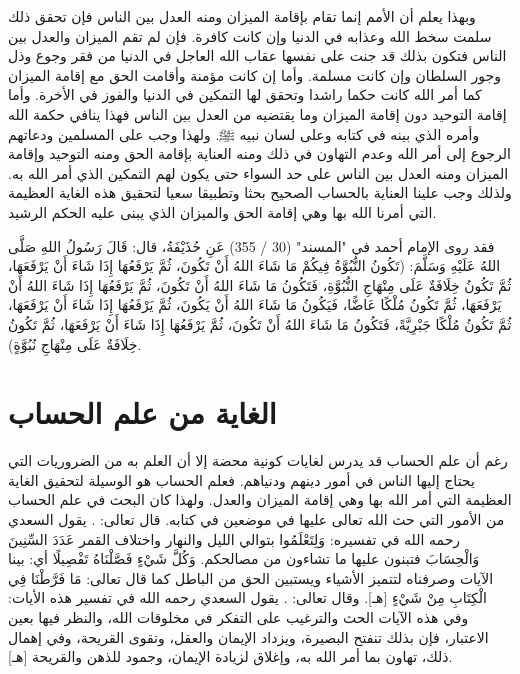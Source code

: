 وبهذا يعلم أن الأمم إنما تقام بإقامة الميزان ومنه العدل بين الناس فإن تحقق ذلك سلمت سخط الله وعذابه في الدنيا وإن كانت كافرة. فإن لم تقم الميزان والعدل بين الناس فتكون بذلك قد جنت على نفسها عقاب الله العاجل في الدنيا من فقر وجوع وذل وجور السلطان  وإن كانت مسلمة. وأما إن كانت مؤمنة وأقامت الحق مع إقامة الميزان كما أمر الله كانت حكما راشدا وتحقق لها التمكين في الدنيا والفوز في الأخرة. وأما إقامة التوحيد دون إقامة الميزان وما يقتضيه من العدل بين الناس فهذا ينافي حكمة الله وأمره الذي بينه في كتابه وعلى لسان نبيه ﷺ. ولهذا وجب على المسلمين ودعاتهم الرجوع إلى أمر الله وعدم التهاون في ذلك ومنه العناية بإقامة الحق ومنه التوحيد وإقامة الميزان ومنه العدل بين الناس على حد السواء حتى يكون لهم التمكين الذي أمر الله به. ولذلك وجب علينا العناية بالحساب الصحيح بحثا وتطبيقا سعيا لتحقيق هذه الغاية العظيمة التي أمرنا الله بها وهي إقامة الحق والميزان الذي يبنى عليه الحكم الرشيد.

فقد روى الإمام أحمد في "المسند" (30 / 355) عَنِ حُذَيْفَةُ، قال: قَالَ رَسُولُ اللهِ صَلَّى اللهُ عَلَيْهِ وَسَلَّمَ: (تَكُونُ النُّبُوَّةُ فِيكُمْ مَا شَاءَ اللهُ أَنْ تَكُونَ، ثُمَّ يَرْفَعُهَا إِذَا شَاءَ أَنْ يَرْفَعَهَا، ثُمَّ تَكُونُ خِلَافَةٌ عَلَى مِنْهَاجِ النُّبُوَّةِ، فَتَكُونُ مَا شَاءَ اللهُ أَنْ تَكُونَ، ثُمَّ يَرْفَعُهَا إِذَا شَاءَ اللهُ أَنْ يَرْفَعَهَا، ثُمَّ تَكُونُ مُلْكًا عَاضًّا، فَيَكُونُ مَا شَاءَ اللهُ أَنْ يَكُونَ، ثُمَّ يَرْفَعُهَا إِذَا شَاءَ أَنْ يَرْفَعَهَا، ثُمَّ تَكُونُ مُلْكًا جَبْرِيَّةً، فَتَكُونُ مَا شَاءَ اللهُ أَنْ تَكُونَ، ثُمَّ يَرْفَعُهَا إِذَا شَاءَ أَنْ يَرْفَعَهَا، ثُمَّ تَكُونُ خِلَافَةٌ عَلَى مِنْهَاجِ نُبُوَّةٍ).


\section{الغاية من علم الحساب}

رغم أن علم الحساب قد يدرس لغايات كونية محضة إلا أن العلم به من الضروريات التي يحتاج إليها الناس في أمور دينهم ودنياهم. فعلم الحساب هو الوسيلة لتحقيق الغاية العظيمة التي أمر الله بها وهي إقامة الميزان والعدل. ولهذا كان البحث في علم الحساب من الأمور التي حث الله تعالى عليها في موضعين في كتابه. قال تعالى: \quranayah*[17][12]{\footnotesize \surahname*[17]}.
يقول السعدي رحمه الله في تفسيره:
{ وَلِتَعْلَمُوا } بتوالي الليل والنهار واختلاف القمر { عَدَدَ السِّنِينَ وَالْحِسَابَ } فتبنون عليها ما تشاءون من مصالحكم. { وَكُلَّ شَيْءٍ فَصَّلْنَاهُ تَفْصِيلًا } أي: بينا الآيات وصرفناه لتتميز الأشياء ويستبين الحق من الباطل كما قال تعالى: { مَا فَرَّطْنَا فِي الْكِتَابِ مِنْ شَيْءٍ }
[هـ]. وقال تعالى: \quranayah*[10][5]{\footnotesize \surahname*[10]}.
يقول السعدي رحمه الله في تفسير هذه الأيات:
وفي هذه الآيات الحث والترغيب على التفكر في مخلوقات الله، والنظر فيها بعين الاعتبار، فإن بذلك تنفتح البصيرة، ويزداد الإيمان والعقل، وتقوى القريحة، وفي إهمال ذلك، تهاون بما أمر الله به، وإغلاق لزيادة الإيمان، وجمود للذهن والقريحة
[هـ].

